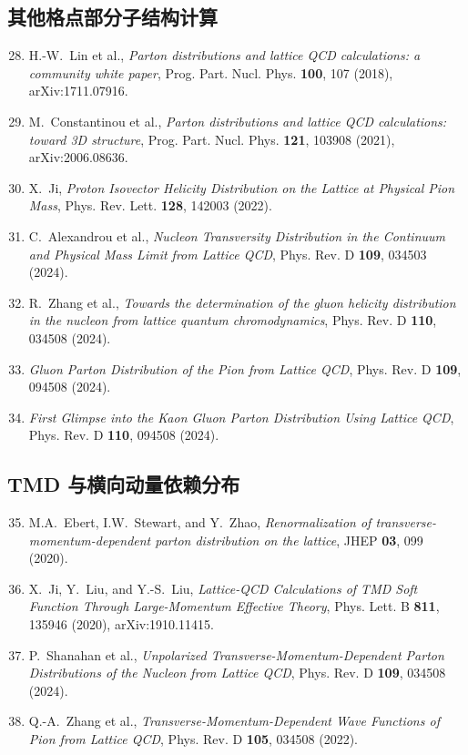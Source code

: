 \documentclass[11pt,a4paper]{ctexart}
\begin{document}
\subsection*{其他格点部分子结构计算}
\begin{enumerate}\setcounter{enumi}{27}
  \item H.-W.~Lin et al., \textit{Parton distributions and lattice QCD calculations: a community white paper}, Prog. Part. Nucl. Phys. \textbf{100}, 107 (2018), arXiv:1711.07916.
  \item M.~Constantinou et al., \textit{Parton distributions and lattice QCD calculations: toward 3D structure}, Prog. Part. Nucl. Phys. \textbf{121}, 103908 (2021), arXiv:2006.08636.
  \item X.~Ji, \textit{Proton Isovector Helicity Distribution on the Lattice at Physical Pion Mass}, Phys. Rev. Lett. \textbf{128}, 142003 (2022).
  \item C.~Alexandrou et al., \textit{Nucleon Transversity Distribution in the Continuum and Physical Mass Limit from Lattice QCD}, Phys. Rev. D \textbf{109}, 034503 (2024).
  \item R.~Zhang et al., \textit{Towards the determination of the gluon helicity distribution in the nucleon from lattice quantum chromodynamics}, Phys. Rev. D \textbf{110}, 034508 (2024).
  \item \textit{Gluon Parton Distribution of the Pion from Lattice QCD}, Phys. Rev. D \textbf{109}, 094508 (2024).
  \item \textit{First Glimpse into the Kaon Gluon Parton Distribution Using Lattice QCD}, Phys. Rev. D \textbf{110}, 094508 (2024).
\end{enumerate}

\subsection*{TMD 与横向动量依赖分布}
\begin{enumerate}\setcounter{enumi}{34}
  \item M.A.~Ebert, I.W.~Stewart, and Y.~Zhao, \textit{Renormalization of transverse-momentum-dependent parton distribution on the lattice}, JHEP \textbf{03}, 099 (2020).
  \item X.~Ji, Y.~Liu, and Y.-S.~Liu, \textit{Lattice-QCD Calculations of TMD Soft Function Through Large-Momentum Effective Theory}, Phys. Lett. B \textbf{811}, 135946 (2020), arXiv:1910.11415.
  \item P.~Shanahan et al., \textit{Unpolarized Transverse-Momentum-Dependent Parton Distributions of the Nucleon from Lattice QCD}, Phys. Rev. D \textbf{109}, 034508 (2024).
  \item Q.-A.~Zhang et al., \textit{Transverse-Momentum-Dependent Wave Functions of Pion from Lattice QCD}, Phys. Rev. D \textbf{105}, 034508 (2022).
\end{enumerate}
\end{document}
